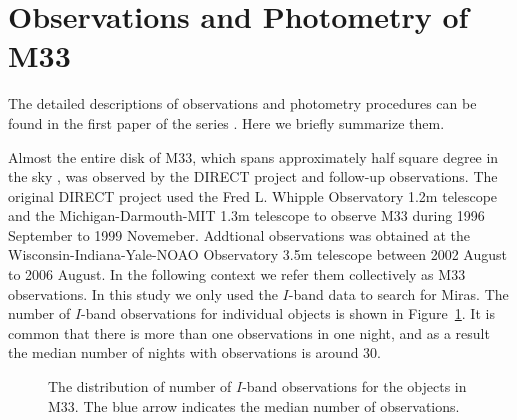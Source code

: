 \section{Observations and Photometry of M33} \label{sec.observations}

The detailed descriptions of observations and photometry procedures can be found in the first paper of the series \citep{2011ApJS..193...26P}. Here we briefly summarize them.

Almost the entire disk of M33, which spans approximately half square degree in the sky \citep{1895MNRAS..56...70R}, was observed by the DIRECT project and follow-up observations. The original DIRECT project used the Fred L. Whipple Observatory 1.2m telescope and the Michigan-Darmouth-MIT 1.3m telescope to observe M33 during 1996 September to 1999 Novemeber. Addtional observations was obtained at the Wisconsin-Indiana-Yale-NOAO Observatory 3.5m telescope between 2002 August to 2006 August. In the following context we refer them collectively as M33 observations. In this study we only used the $I$-band data to search for Miras. The number of $I$-band observations for individual objects is shown in Figure~\ref{fig.n_obs}. It is common that there is more than one observations in one night, and as a result the median number of nights with observations is around 30.

\begin{figure}
\caption{The distribution of number of $I$-band observations for the objects in M33. The blue arrow indicates the median number of observations.}\label{fig.n_obs}
\end{figure}
